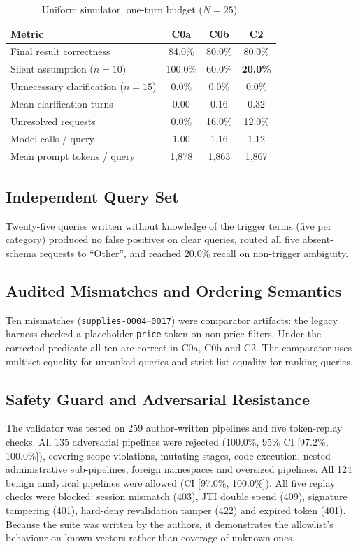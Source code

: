 \begin{table}[t]
\centering\footnotesize
\caption{Uniform simulator, one-turn budget ($N{=}25$).}
\label{tab:fair}
\begin{tabular}{lccc}
\toprule
\textbf{Metric} & \textbf{C0a} & \textbf{C0b} & \textbf{C2} \\
\midrule
Final result correctness & 84.0\% & 80.0\% & 80.0\% \\
Silent assumption ($n{=}10$) & 100.0\% & 60.0\% & \textbf{20.0\%} \\
Unnecessary clarification ($n{=}15$) & 0.0\% & 0.0\% & 0.0\% \\
Mean clarification turns & 0.00 & 0.16 & 0.32 \\
Unresolved requests & 0.0\% & 16.0\% & 12.0\% \\
Model calls / query & 1.00 & 1.16 & 1.12 \\
Mean prompt tokens / query & 1,878 & 1,863 & 1,867 \\
\bottomrule
\end{tabular}
\end{table}

\subsection{Independent Query Set}
Twenty-five queries written without knowledge of the trigger terms (five per category) produced no false positives on clear queries, routed all five absent-schema requests to ``Other'', and reached 20.0\% recall on non-trigger ambiguity.

\subsection{Audited Mismatches and Ordering Semantics}
\label{sec:audit}
Ten mismatches (\texttt{supplies-0004}--\texttt{0017}) were comparator artifacts: the legacy harness checked a placeholder \texttt{price} token on non-price filters. Under the corrected predicate all ten are correct in C0a, C0b and C2. The comparator uses multiset equality for unranked queries and strict list equality for ranking queries.

\subsection{Safety Guard and Adversarial Resistance}
The validator was tested on 259 author-written pipelines and five token-replay checks. All 135 adversarial pipelines were rejected (100.0\%, 95\% CI [97.2\%, 100.0\%]), covering scope violations, mutating stages, code execution, nested administrative sub-pipelines, foreign namespaces and oversized pipelines. All 124 benign analytical pipelines were allowed (CI [97.0\%, 100.0\%]). All five replay checks were blocked: session mismatch (403), JTI double spend (409), signature tampering (401), hard-deny revalidation tamper (422) and expired token (401).
Because the suite was written by the authors, it demonstrates the allowlist's behaviour on known vectors rather than coverage of unknown ones.

